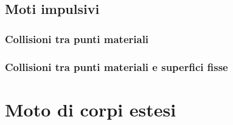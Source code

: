 \subsection{Moti impulsivi}
{\color{red}
\subsubsection{Collisioni tra punti materiali}
\subsubsection{Collisioni tra punti materiali e superfici fisse}
}

\section{Moto di corpi estesi}

